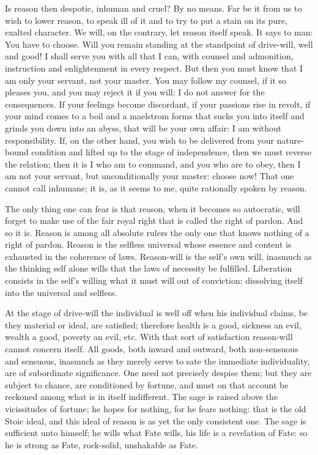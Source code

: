 \documentclass[12pt,a4paper,openany]{book}
\newcommand{\opage}[1]{\marginnote{\footnotesize\textit{[#1]}}}
\begin{document}
Is reason then despotic, inhuman and cruel? By no means. Far be it from us to wish to lower reason, to speak ill of it and to
try to put a stain on its pure, exalted character. We will, on the contrary, let reason itself speak. It says to man: You have
to choose. Will you remain standing at the standpoint of drive-will, well and good! I shall serve you with all that I can,
with counsel and admonition, instruction and
\setcounter{footnote}{0}%
\opage{28}enlightenment in every respect. But then you must know that I am only your servant, not your master. You may follow my
counsel, if it so pleases you, and you may reject it if you will: I do not answer for the consequences. If your feelings
become discordant, if your passions rise in revolt, if your mind comes to a boil and a maelstrom forms that sucks you into
itself and grinds you down into an abyss, that will be your own affair: I am without responsibility. If, on the other hand,
you wish to be delivered from your nature-bound condition and lifted up to the stage of independence, then we must reverse the
relation; then it is I who am to command, and you who are to obey, then I am not your servant, but unconditionally your
master: choose now! That one cannot call inhumane; it is, as it seems to me, quite rationally spoken by reason.

The only thing one can fear is that reason, when it becomes so autocratic, will forget to make use of the fair royal right
that is called the right of pardon. And so it is. Reason is among all absolute rulers the only one that knows nothing of a
right of pardon. Reason is the selfless universal whose essence and content is exhausted in the coherence of laws. Reason-will
is the self's own will, inasmuch as the thinking self alone wills that the laws of necessity be fulfilled. Liberation consists
in the self's willing what it must will out of conviction: dissolving itself into the universal and selfless.

At the stage of drive-will the individual is well off when his individual claims, be they material or ideal, are satisfied;
therefore health is a good, sickness an evil, wealth a good, poverty an evil, etc. With that sort of satisfaction reason-will
cannot concern itself. All goods, both inward and outward, both non-sensuous and sensuous, inasmuch as they merely serve to
sate the immediate individuality, are of subordinate significance. One need not precisely despise them; but they are subject
to chance, are conditioned by fortune, and must on that account be reckoned among what is in itself indifferent. The sage is
raised above the vicissitudes of fortune; he hopes for nothing,
\setcounter{footnote}{0}%
\opage{29}for he fears nothing: that is the old Stoic ideal, and this ideal of reason is as yet the only consistent one. The
sage is sufficient unto himself; he wills what Fate wills, his life is a revelation of Fate: so he is strong as Fate,
rock-solid, unshakable as Fate.
\end{document}
